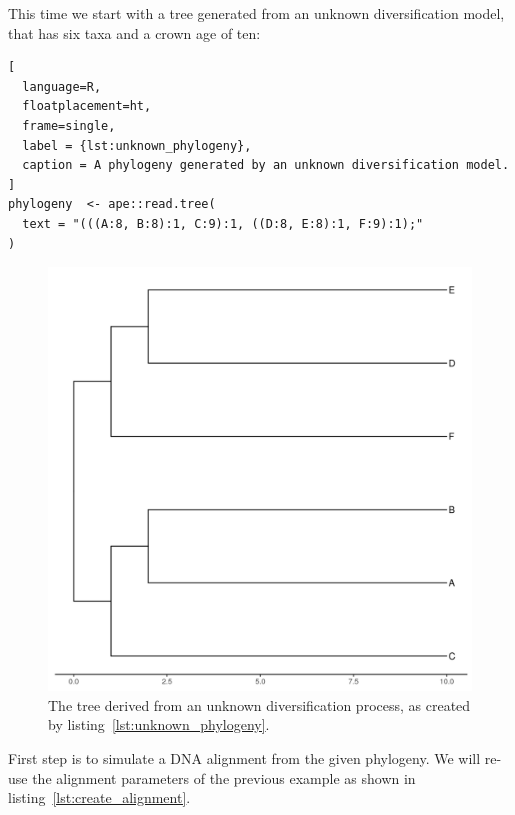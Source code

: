 \documentclass{article}
\begin{document}
This time we start with a tree generated from an unknown 
diversification model, that has six taxa and a crown age of ten:

\begin{lstlisting}[
  language=R, 
  floatplacement=ht, 
  frame=single, 
  label = {lst:unknown_phylogeny},
  caption = A phylogeny generated by an unknown diversification model.
]
phylogeny  <- ape::read.tree(
  text = "(((A:8, B:8):1, C:9):1, ((D:8, E:8):1, F:9):1);"
)
\end{lstlisting}
\begin{figure}[H]
  \includegraphics[width=\textwidth]{example_2/tree_unknown.png}
  \caption{The tree derived from an unknown diversification process, 
    as created by listing~\ref{lst:unknown_phylogeny}.
  }
\end{figure}

First step is to simulate a DNA alignment from the 
given phylogeny. 
We will re-use the alignment parameters of the previous example 
as shown in listing~\ref{lst:create_alignment}.
\end{document}
